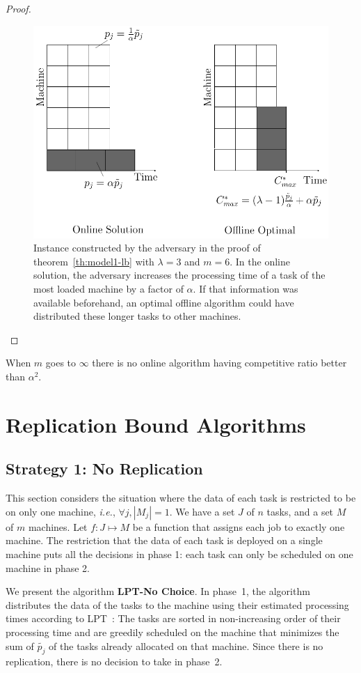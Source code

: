 \documentclass[twocolumn]{svjour3}
\begin{document}
\begin{proof}
  \begin{figure}[htp]
  \centering
  \includegraphics[width= 8 cm]{model1.pdf}
  \caption{Instance constructed by the adversary in the proof of
    theorem~\ref{th:model1-lb} with $\lambda = 3$ and $m = 6$. In the
    online solution, the adversary increases 
    the processing time of a task of the most loaded machine by a factor of $\alpha$. If
    that information was available beforehand, an optimal offline
    algorithm could have distributed these longer tasks to other
    machines.}
  \label{fig:rara}
  \end{figure}
\end{proof}    
  
  
  \begin{corollary}
  When $m$ goes to $\infty$ there is no online algorithm having competitive ratio better than $\alpha^{2}$.
  \end{corollary}


\section{Replication Bound Algorithms}

\subsection{Strategy 1: No Replication}\label{sec4}


This section considers the situation where the data of each task is
restricted to be on only one machine, {\em i.e.}, $\forall j, |M_j|=1$.  We
have a set $J$ of $n$ tasks, and a set $M$ of $m$ machines.  Let $f :
J \mapsto M$ be a function that assigns each job to exactly one
machine. The restriction that the data of each task is deployed on a
single machine puts all the decisions in phase 1: each task can only be
scheduled on one machine in phase 2.


We present the algorithm \textbf{LPT-No Choice}. In phase~1, the
algorithm distributes the data of the tasks to the machine using
their estimated processing times according to 
LPT~\cite{Graham69boundson}: The tasks are sorted in non-increasing
order of their processing time and are greedily scheduled on the
machine that minimizes the sum of $\tilde{p_j}$ of the tasks
already allocated on that machine. Since there is no replication, there is
no decision to take in phase~2.
\end{document}
